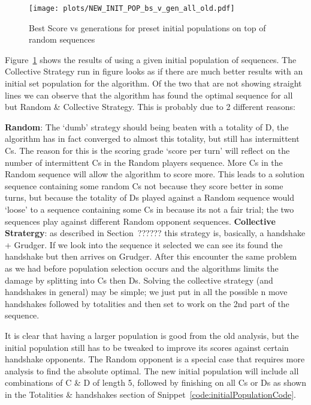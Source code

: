 \begin{figure}[h]
    \texttt{[image: plots/NEW\_INIT\_POP\_bs\_v\_gen\_all\_old.pdf]}
    \caption{Best Score vs generations for preset initial populations on top of random sequences}\label{fig:NEW-INIT-POP-bs-v-gen-all}
\end{figure}

Figure~\ref{fig:NEW-INIT-POP-bs-v-gen-all} shows the results of using a given initial population of sequences.
The Collective Strategy run in figure looks as if there are much better results with an initial set population for the algorithm.
Of the two that are not showing straight lines we can observe that the algorithm has found the optimal sequence for all but Random \& Collective Strategy.
This is probably due to 2 different reasons:

\textbf{Random}: The `dumb' strategy should being beaten with a totality of D, the algorithm has in fact converged to almost this totality, but still has intermittent Cs.
The reason for this is the scoring grade `score per turn' will reflect on the number of intermittent Cs in the Random players sequence. More Cs in the Random sequence will allow the algorithm to score more. This leads to a solution sequence containing some random Cs not because they score better in some turns, but because the totality of Ds played against a Random sequence would `loose' to a sequence containing some Cs in because its not a fair trial; the two sequences play against different Random opponent sequences.
\textbf{Collective Stratergy}: as described in Section~?????? this strategy is, basically, a handshake + Grudger. If we look into the sequence it selected we can see its found the handshake but then arrives on Grudger. After this encounter the same problem as we had before population selection occurs and the algorithms limits the damage by splitting into Cs then Ds. Solving the collective strategy (and handshakes in general) may be simple; we just put in all the possible n move handshakes followed by totalities and then set to work on the 2nd part of the sequence.

It is clear that having a larger population is good from the old analysis, but the initial population still has to be tweaked to improve its scores against certain handshake opponents.
The Random opponent is a special case that requires more analysis to find the absolute optimal.
The new initial population will include all combinations of C \& D of length 5, followed by finishing on all Cs or Ds as shown in the Totalities \& handshakes section of Snippet~\ref{code:initialPopulationCode}.

